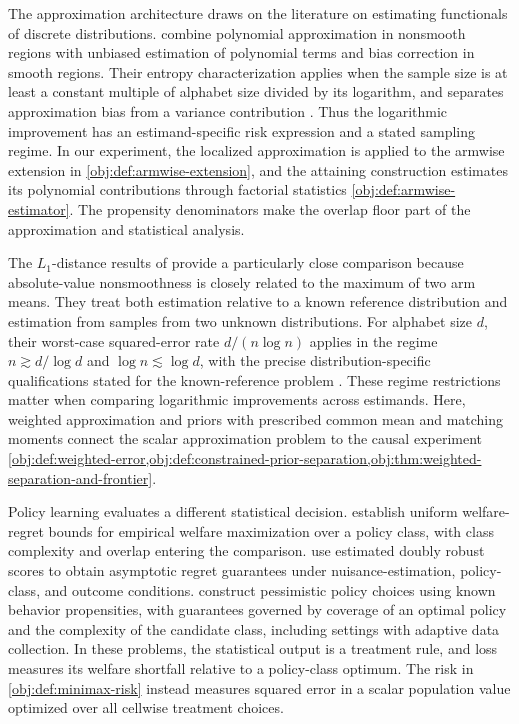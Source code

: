 The approximation architecture draws on the literature on estimating functionals of discrete distributions. \citet{JiaoVenkatHanWeissman2015Functionals} combine polynomial approximation in nonsmooth regions with unbiased estimation of polynomial terms and bias correction in smooth regions. Their entropy characterization applies when the sample size is at least a constant multiple of alphabet size divided by its logarithm, and separates approximation bias from a variance contribution \citep[Theorem~1]{JiaoVenkatHanWeissman2015Functionals}. Thus the logarithmic improvement has an estimand-specific risk expression and a stated sampling regime. In our experiment, the localized approximation is applied to the armwise extension in \cref{obj:def:armwise-extension}, and the attaining construction estimates its polynomial contributions through factorial statistics \cref{obj:def:armwise-estimator}. The propensity denominators make the overlap floor part of the approximation and statistical analysis.

The \(L_1\)-distance results of \citet{JiaoHanWeissman2018L1} provide a particularly close comparison because absolute-value nonsmoothness is closely related to the maximum of two arm means. They treat both estimation relative to a known reference distribution and estimation from samples from two unknown distributions. For alphabet size \(d\), their worst-case squared-error rate \(d/(n\log n)\) applies in the regime \(n\gtrsim d/\log d\) and \(\log n\lesssim\log d\), with the precise distribution-specific qualifications stated for the known-reference problem \citep[Theorems~2--4 and~6, Remark~1]{JiaoHanWeissman2018L1}. These regime restrictions matter when comparing logarithmic improvements across estimands. Here, weighted approximation and priors with prescribed common mean and matching moments connect the scalar approximation problem to the causal experiment \cref{obj:def:weighted-error,obj:def:constrained-prior-separation,obj:thm:weighted-separation-and-frontier}.

Policy learning evaluates a different statistical decision. \citet[Assumption~2.1 and Theorems~2.1--2.2]{Kitagawa2018} establish uniform welfare-regret bounds for empirical welfare maximization over a policy class, with class complexity and overlap entering the comparison. \citet[Theorem~1]{Athey2021} use estimated doubly robust scores to obtain asymptotic regret guarantees under nuisance-estimation, policy-class, and outcome conditions. \citet{JinRenYangWang2025Pessimism} construct pessimistic policy choices using known behavior propensities, with guarantees governed by coverage of an optimal policy and the complexity of the candidate class, including settings with adaptive data collection. In these problems, the statistical output is a treatment rule, and loss measures its welfare shortfall relative to a policy-class optimum. The risk in \cref{obj:def:minimax-risk} instead measures squared error in a scalar population value optimized over all cellwise treatment choices.

